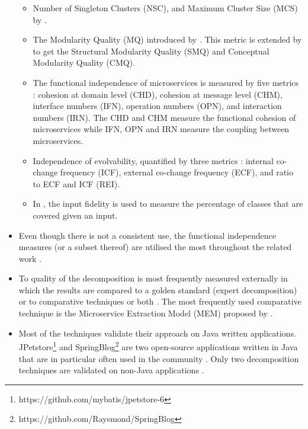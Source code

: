 \begin{itemize}
    \begin{itemize}
        \item Number of Singleton Clusters (NSC), and Maximum Cluster Size (MCS) by \cite{nunes2019monolith}.
        \item The Modularity Quality (MQ) introduced by \citeauthor{mancoridis1998using} \cite{mancoridis1998using}. This metric is extended by \cite{jin2019service} to get the Structural Modularity Quality (SMQ) and Conceptual Modularity Quality (CMQ).
        \item The functional independence of microservices is measured by five metrics \cite{jin2018functionality}: cohesion at domain level (CHD), cohesion at message level (CHM), interface numbers (IFN), operation numbers (OPN), and interaction numbers (IRN). The CHD and CHM measure the functional cohesion of microservices while IFN, OPN and IRN measure the coupling between microservices.
        \item Independence of evolvability, quantified by three metrics \cite{jin2019service}: internal co-change frequency (ICF), external co-change frequency (ECF), and ratio to ECF and ICF (REI). 
        \item In \cite{lohnertz2020steinmetz}, the input fidelity is used to measure the percentage of classes that are covered given an input.
    \end{itemize}
    \item Even though there is not a consistent use, the functional independence measures (or a subset thereof) are utilised the most throughout the related work \cite{al2021microservice, jin2018functionality, jin2019service, saidani2019towards, brito2021identification}.
    \item To quality of the decomposition is most frequently measured externally in which the results are compared to a golden standard (expert decomposition) \cite{eski2018automatic, kamimura2018extracting, selmadji2018re, selmadji2020monolithic, zhang2020automated} or to comparative techniques \cite{al2021microservice, jin2018functionality, jin2019service, matias2020determining, saidani2019towards} or both \cite{nunes2019monolith, zhang2020automated}. The most frequently used comparative technique is the Microservice Extraction Model (MEM) proposed by \citeauthor*{mazlami2017extraction} \cite{mazlami2017extraction}.
    \item Most of the techniques validate their approach on Java written applications. JPetstore\footnote{https://github.com/mybatis/jpetstore-6} and SpringBlog\footnote{https://github.com/Raysmond/SpringBlog} are two open-source applications written in Java that are in particular often used in the community \cite{al2021microservice, brito2021identification, jin2018functionality, saidani2019towards}. Only two decomposition techniques are validated on non-Java applications \cite{matias2020determining, mazlami2017extraction}.
\end{itemize}